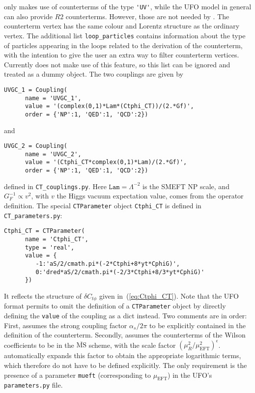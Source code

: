 \gosam only makes use of counterterms of the type \lstinline{'UV'}, while the UFO model in general can also provide $R2$ counterterms. However, those are not needed by \gosam. The counterterm vertex has the same colour and Lorentz structure as the ordinary vertex. The additional list \texttt{loop\_particles} contains information about the type of particles appearing in the loops related to the derivation of the counterterm, with the intention to give the user an extra way to filter counterterm vertices. Currently \gosam does not make use of this feature, so this list can be ignored and treated as a dummy object. The two couplings are given by
\begin{lstlisting}[gobble=3,style=py]
   UVGC_1 = Coupling(
      name = 'UVGC_1',
      value = '(complex(0,1)*Lam*(Ctphi_CT))/(2.*Gf)',
      order = {'NP':1, 'QED':1, 'QCD':2})
\end{lstlisting}
and
\begin{lstlisting}[gobble=3,style=py]
   UVGC_2 = Coupling(
      name = 'UVGC_2',
      value = '(Ctphi_CT*complex(0,1)*Lam)/(2.*Gf)',
      order = {'NP':1, 'QED':1, 'QCD':2})
\end{lstlisting}
defined in \texttt{CT\_couplings.py}. Here $\texttt{Lam}=\Lambda^{-2}$ is the SMEFT NP scale, and $G_F^{-1}\propto v^2$, with $v$ the Higgs vacuum expectation value, comes from the operator definition. The special \texttt{CTParameter} object \texttt{Ctphi\_CT} is defined in \texttt{CT\_parameters.py}:
\begin{lstlisting}[gobble=3,style=py]
   Ctphi_CT = CTParameter(
      name = 'Ctphi_CT',
      type = 'real',
      value = {
         -1:'aS/2/cmath.pi*(-2*Ctphi+8*yt*CphiG)',
         0:'dred*aS/2/cmath.pi*(-2/3*Ctphi+8/3*yt*CphiG)'
      })
\end{lstlisting}
It reflects the structure of $\delta C_{t\phi}$ given in~(\ref{eq:Ctphi_CT}). Note that the UFO format permits to omit the definition of a \texttt{CTParameter} object by directly defining the \texttt{value} of the coupling as a \python dict instead.
Two comments are in order: First, \gosam assumes the strong coupling factor $\alpha_s/2\pi$ to be explicitly contained in the definition of the counterterm. Secondly, \gosam assumes the counterterms of the Wilson coefficients to be in the $\overline{\text{MS}}$ scheme, with the scale factor $\left(\mu_R^2/\mu_\mathrm{EFT}^2\right)^\epsilon$. \gosam automatically expands this factor to obtain the appropriate logarithmic terms, which therefore do not have to be defined explicitly. The only requirement is the presence of a parameter \texttt{mueft} (corresponding to $\mu_\mathrm{EFT}$) in the UFO's \texttt{parameters.py} file.
